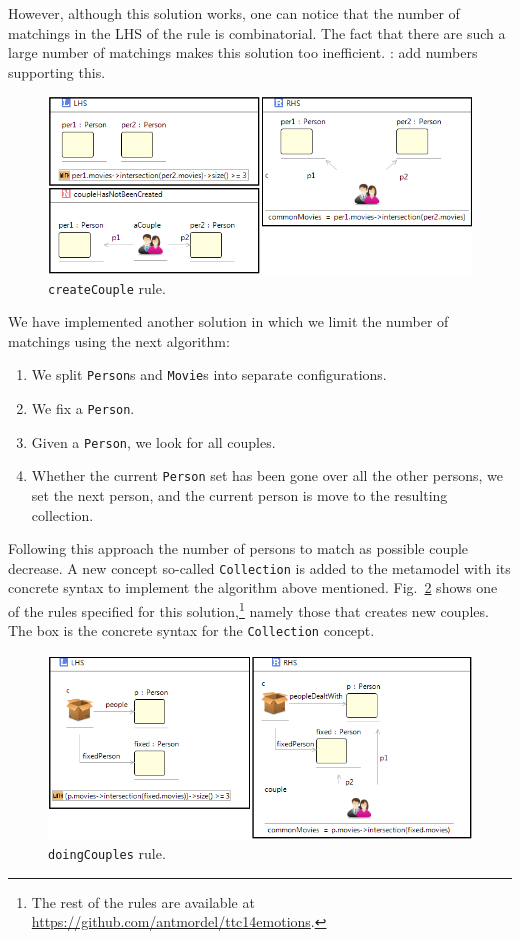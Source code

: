 \documentclass[draft]{llncs}
\newcommand{\todo}[1]{\textbf{\color{red}{TO-DO}}: #1}
\newcommand{\todo}[1]{}
\newcommand{\code}[1]{{\texttt{#1}}}
\begin{document}
However, although this solution works, one can notice that the number of matchings in the LHS of the rule is combinatorial. The fact that there are such a large number of matchings makes this solution too inefficient. \todo{add numbers supporting this.}

\begin{figure}[htp]
  \centering
  \includegraphics[width=\textwidth]{imgs/ruleCouples}
  \caption{\code{createCouple} rule.}\label{fig:createCouple}
\end{figure}

We have implemented another solution in which we limit the number of matchings using the next algorithm:
\begin{enumerate}
  \item We split \code{Person}s and \code{Movie}s into separate configurations.
  \item We fix a \code{Person}.
  \item Given a \code{Person}, we look for all couples.
  \item Whether the current \code{Person} set has been gone over all the other persons, we set the next person, and the current person is move to the resulting collection.
\end{enumerate}

Following this approach the number of persons to match as possible couple decrease. A new concept so-called \code{Collection} is added to the metamodel with its concrete syntax to implement the algorithm above mentioned. Fig.~\ref{fig:areCouples} shows one of the rules specified for this solution,\footnote{The rest of the rules are available at \url{https://github.com/antmordel/ttc14emotions}.} namely those that creates new couples. The box is the concrete syntax for the \code{Collection} concept.

\begin{figure}[htp]
  \centering
  \includegraphics[width=\textwidth]{imgs/areCouple}
  \caption{\code{doingCouples} rule.}\label{fig:areCouples}
\end{figure}
\end{document}
